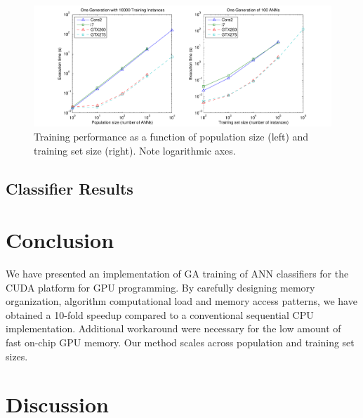 \documentclass[11pt]{article}       %
\begin{document}
\begin{figure}
	\includegraphics[width=\textwidth]{fig-performance}
	\caption{Training performance as a function of population size (left) and training set size (right). Note logarithmic axes.}
	\label{fig:training-performance}
\end{figure}

\subsection{Classifier Results} \label{results}

\section{Conclusion} \label{concl}
We have presented an implementation of GA training of ANN classifiers for the CUDA platform for GPU programming. By carefully designing memory organization, algorithm computational load and memory access patterns, we have obtained a 10-fold speedup compared to a conventional sequential CPU implementation. Additional workaround were necessary for the low amount of fast on-chip GPU memory. Our method scales across population and training set sizes.

\section{Discussion} \label{disc}

\end{document}

